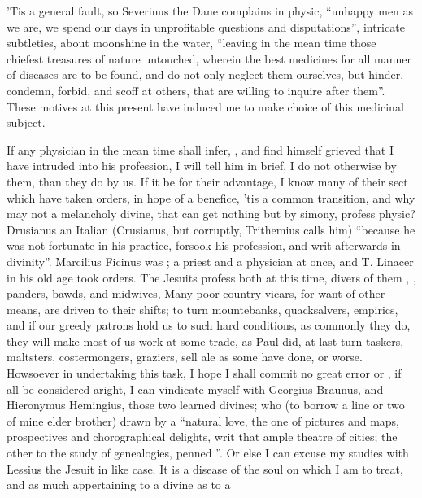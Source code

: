 'Tis a general fault, so Severinus the Dane complains in
physic, \enquote{unhappy men as we are, we spend our days in unprofitable questions and
disputations}, intricate subtleties,  about moonshine in
the water, \enquote{leaving in the mean time those chiefest treasures of nature
untouched, wherein the best medicines for all manner of diseases are to be
found, and do not only neglect them ourselves, but hinder, condemn, forbid, and
scoff at others, that are willing to inquire after them}. These motives at this
present have induced me to make choice of this medicinal subject.

If any physician in the mean time shall infer, ,
and find himself grieved that I have intruded into his profession, I will tell
him in brief, I do not otherwise by them, than they do by us. If it be for
their advantage, I know many of their sect which have taken orders, in hope of
a benefice, 'tis a common transition, and why may not a melancholy divine, that
can get nothing but by simony, profess physic? Drusianus an Italian (Crusianus,
but corruptly, Trithemius calls him) \enquote{because he was not
fortunate in his practice, forsook his profession, and writ afterwards in
divinity}. Marcilius Ficinus was ; a priest and a physician
at once, and T. Linacer in his old age took orders. The
Jesuits profess both at this time, divers of them ,
, panders, bawds, and midwives, \etc{} Many poor
country-vicars, for want of other means, are driven to their shifts; to turn
mountebanks, quacksalvers, empirics, and if our greedy patrons hold us to such
hard conditions, as commonly they do, they will make most of us work at some
trade, as Paul did, at last turn taskers, maltsters, costermongers, graziers,
sell ale as some have done, or worse. Howsoever in undertaking this task, I
hope I shall commit no great error or , if all be considered
aright, I can vindicate myself with Georgius Braunus, and Hieronymus Hemingius,
those two learned divines; who (to borrow a line or two of mine
elder brother) drawn by a \enquote{natural love, the one of
pictures and maps, prospectives and chorographical delights, writ that ample
theatre of cities; the other to the study of genealogies, penned }. Or else I can excuse my studies with
Lessius the Jesuit in like case. It is a disease of the
soul on which I am to treat, and as much appertaining to a divine as to a
